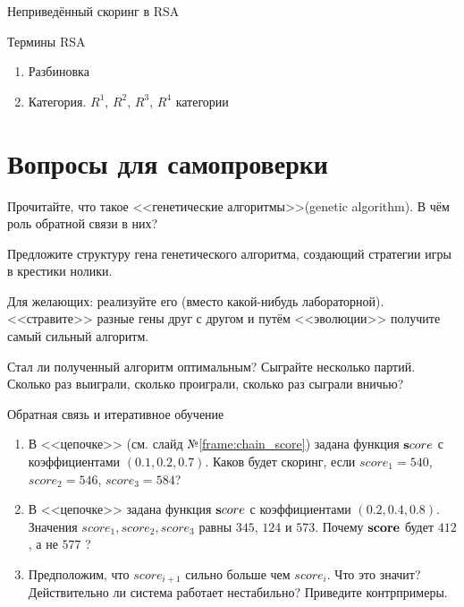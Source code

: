 \begin{frame}{Неприведённый скоринг в RSA}

\end{frame}


\begin{frame}{Термины RSA}\label{frame:rsa_risk_engine_terms}
	\begin{enumerate}
		\item Разбиновка 
		\item Категория. $R^1$, $R^2$, $R^3$, $R^4$ категории
	
	\end{enumerate}
\end{frame}


  
\section{Вопросы для самопроверки}

\begin{frame}
	Прочитайте, что такое <<генетические алгоритмы>>(genetic algorithm).
	В чём роль обратной связи в них?
	
	Предложите структуру гена генетического алгоритма, создающий стратегии игры в крестики нолики. 
	
	Для желающих: реализуйте его (вместо какой-нибудь лабораторной). 
	<<стравите>> разные гены друг с другом и путём <<эволюции>>
	получите самый сильный алгоритм.
	
	Стал ли полученный алгоритм оптимальным? Сыграйте несколько партий. Сколько раз выиграли, 
	сколько проиграли, сколько раз сыграли вничью?
	
\end{frame}

\begin{frame}{Обратная связь и итеративное обучение}
	\begin{enumerate}
		\item В <<цепочке>> (см. слайд №\ref{frame:chain_score}) задана функция
		$\bold score$ с коэффициентами $(0.1, 0.2, 0.7)$. Каков будет скоринг, 
		если $score_1=540$, $score_2=546$, $score_3=584$?
		\item В <<цепочке>> задана функция 	$\bold score$ 
		с коэффициентами $(0.2, 0.4, 0.8)$. Значения $score_1, score_2, score_3$
		равны $345$, $124$ и $573$. Почему $\bold {score}$ 
		будет $412$, 
		а не $577$ ?
		\item Предположим, что $score_{i+1}$ 
		сильно больше чем $score_i$. Что это значит? 
		Действительно ли система работает нестабильно? 
		Приведите контрпримеры.
		
	\end{enumerate}
\end{frame}

